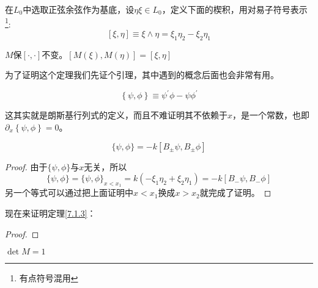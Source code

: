 在$L_0$中选取正弦余弦作为基底，设$\eta\xi\in L_0$，定义下面的楔积，用对易子符号表示\footnote{有点符号混用}:
\begin{equation}
	\left[\xi,\eta\right]\equiv \xi\wedge \eta =\xi_1\eta_2-\xi_2\eta_1
\end{equation}
\begin{theorem}\label{7.1.3}
	$M$保$\left[\cdot,\cdot\right]$不变。$\left[M(\xi),M(\eta)\right]=\left[\xi,\eta\right]$
\end{theorem}
为了证明这个定理我们先证个引理，其中遇到的概念后面也会非常有用。
\begin{definition}[斜积]
	\begin{equation}
		\left\{\psi,\phi\right\}\equiv\psi^\prime\phi-\psi\phi^\prime
	\end{equation}
\end{definition}
这其实就是朗斯基行列式的定义，而且不难证明其不依赖于$x$，是一个常数，也即$\partial_x\left\{\psi,\phi\right\}=0$。
\begin{lemma}
	\begin{equation}
		\{\psi,\phi\}=-k\left[B_\pm\psi,B_\pm\phi\right]
	\end{equation}
\end{lemma}
\begin{proof}
	由于$\{\psi,\phi\}$与$x$无关，所以
	\begin{equation}
			\{\psi,\phi\}=\{\psi,\phi\}_{x<x_1}=k(-\xi_1\eta_2+\xi_2\eta_1)=-k[B_-\psi,B_-\phi]
	\end{equation}
	另一个等式可以通过把上面证明中$x<x_1$换成$x>x_2$就完成了证明。
\end{proof}
现在来证明定理\ref{7.1.3}：
\begin{proof}
	
\end{proof}
\begin{corollary}
	$\det M=1$
\end{corollary}

